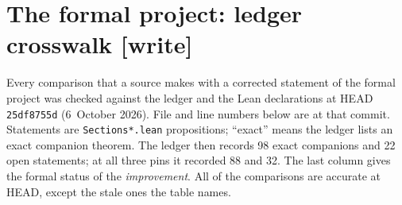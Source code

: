 \documentclass[11pt,letterpaper]{article}
\numberwithin{equation}{section}
\theoremstyle{definition}
\theoremstyle{remark}
\newcommand{\1}{\mathbf 1}
\newcommand{\file}[1]{\nolinkurl{#1}}
\newcommand{\wtag}{\textup{\textbf{[write]}}}
\begin{document}
\section{The formal project: ledger crosswalk \wtag}\label{gsr:fz:sec:crosswalk}
\par{}\par
Every comparison that a source makes with a corrected statement of the formal project was checked against the ledger and the Lean declarations at HEAD \texttt{25df8755d} (6~October 2026). File and line numbers below are at that commit. Statements are \file{Sections*.lean} propositions; ``exact'' means the ledger lists an exact companion theorem. The ledger then records 98 exact companions and 22 open statements; at all three pins it recorded 88 and 32. The last column gives the formal status of the \emph{improvement}. All of the comparisons are accurate at HEAD, except the stale ones the table names.
\end{document}
